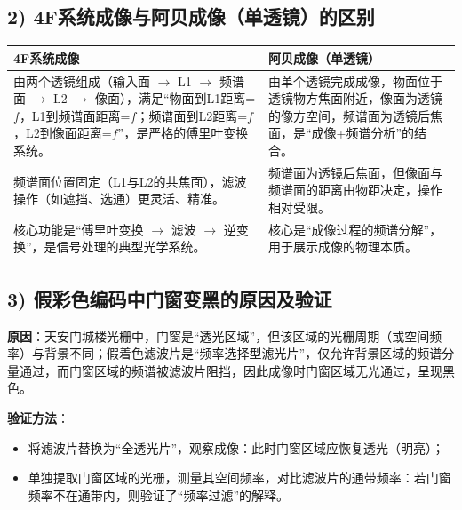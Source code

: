 \documentclass[11pt]{article}
\begin{document}
\subsection*{2) 4F系统成像与阿贝成像（单透镜）的区别}
\begin{table}[!ht]
    \centering
    \begin{tabular}{|p{}|p{}|}
        \hline
        \textbf{4F系统成像} & \textbf{阿贝成像（单透镜）} \\
        \hline
        由两个透镜组成（输入面 $\rightarrow$ L1 $\rightarrow$ 频谱面 $\rightarrow$ L2 $\rightarrow$ 像面），满足“物面到L1距离=$f$，L1到频谱面距离=$f$；频谱面到L2距离=$f$，L2到像面距离=$f$”，是严格的傅里叶变换系统。 & 由单个透镜完成成像，物面位于透镜物方焦面附近，像面为透镜的像方空间，频谱面为透镜后焦面，是“成像+频谱分析”的结合。 \\
        \hline
        频谱面位置固定（L1与L2的共焦面），滤波操作（如遮挡、选通）更灵活、精准。 & 频谱面为透镜后焦面，但像面与频谱面的距离由物距决定，操作相对受限。 \\
        \hline
        核心功能是“傅里叶变换 $\rightarrow$ 滤波 $\rightarrow$ 逆变换”，是信号处理的典型光学系统。 & 核心是“成像过程的频谱分解”，用于展示成像的物理本质。 \\
        \hline
    \end{tabular}
\end{table}


\subsection*{3) 假彩色编码中门窗变黑的原因及验证}
\textbf{原因}：天安门城楼光栅中，门窗是“透光区域”，但该区域的光栅周期（或空间频率）与背景不同；假着色滤波片是“频率选择型滤光片”，仅允许背景区域的频谱分量通过，而门窗区域的频谱被滤波片阻挡，因此成像时门窗区域无光通过，呈现黑色。

\textbf{验证方法}：
\begin{itemize}
    \item 将滤波片替换为“全透光片”，观察成像：此时门窗区域应恢复透光（明亮）；
    \item 单独提取门窗区域的光栅，测量其空间频率，对比滤波片的通带频率：若门窗频率不在通带内，则验证了“频率过滤”的解释。
\end{itemize}
\end{document}
